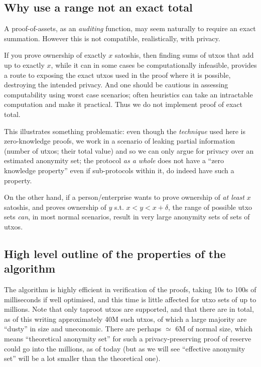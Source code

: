 \documentclass[10pt,a4paper]{article}
\begin{document}
\subsection{Why use a range not an exact total}

A proof-of-assets, as an \emph{auditing} function, may seem naturally to require an exact summation. However this is not compatible, realistically, with privacy.

\vspace{5 pt}

If you prove ownership of exactly $x$ satoshis, then finding sums of utxos that add up to exactly $x$, while it can in some cases be computationally infeasible, provides a route to exposing the exact utxos used in the proof where it is possible, destroying the intended privacy. And one should be cautious in assessing computability using worst case scenarios; often heuristics can take an intractable computation and make it practical. Thus we do not implement proof of exact total.

\vspace{5 pt}
This illustrates something problematic: even though the \emph{technique} used here is zero-knowledge proofs, we work in a scenario of leaking partial information (number of utxos; their total value) and so we can only argue for privacy over an estimated anonymity set; the protocol \emph{as a whole} does not have a ``zero knowledge property'' even if sub-protocols within it, do indeed have such a property.

\vspace{5 pt}

On the other hand, if a person/enterprise wants to prove ownership of \emph{at least} $x$ satoshis, and proves ownership of $y$ s.t. $x < y < x + \delta$, the range of possible utxo sets \emph{can}, in most normal scenarios, result in very large anonymity sets of sets of utxos.

\subsection{High level outline of the properties of the algorithm}

The algorithm is highly efficient in verification of the proofs, taking 10s to 100s of milliseconds if well optimised, and this time is little affected for utxo sets of up to millions. Note that only taproot utxos are supported, and that there are in total, as of this writing approximately 40M such utxos, of which a large majority are ``dusty'' in size and uneconomic. There are perhaps $\simeq$ 6M of normal size, which means ``theoretical anonymity set'' for such a privacy-preserving proof of reserve could go into the millions, as of today (but as we will see ``effective anonymity set'' will be a lot smaller than the theoretical one).
\end{document}
